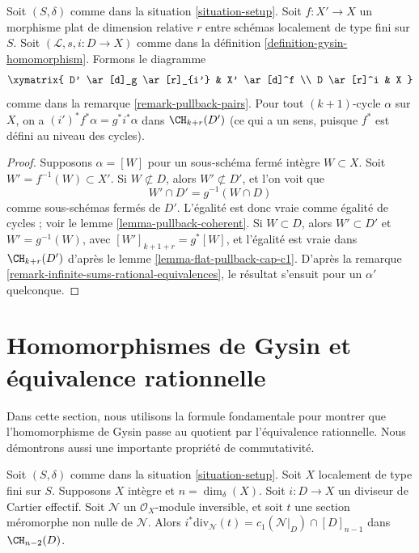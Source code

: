 \begin{lemma}
\label{lemma-gysin-flat-pullback}
Soit $(S, \delta)$ comme dans la situation \ref{situation-setup}. Soit $f : X' \to X$
un morphisme plat de dimension relative $r$ entre schémas localement de type fini
sur $S$. Soit $(\mathcal{L}, s, i : D \to X)$ comme dans la
définition \ref{definition-gysin-homomorphism}. Formons le diagramme
$$
\xymatrix{
D' \ar[d]_g \ar[r]_{i'} & X' \ar[d]^f \\
D \ar[r]^i & X
}
$$
comme dans la remarque \ref{remark-pullback-pairs}.
Pour tout $(k + 1)$-cycle $\alpha$ sur $X$, on a
$(i')^*f^*\alpha = g^*i^*\alpha$ dans $\CH_{k + r}(D')$
(ce qui a un sens, puisque $f^*$ est défini au niveau des cycles).
\end{lemma}

\begin{proof}
Supposons $\alpha = [W]$ pour un sous-schéma fermé intègre
$W \subset X$. Soit $W' = f^{-1}(W) \subset X'$. Si $W \not \subset D$,
alors $W' \not \subset D'$, et l'on voit que
$$
W' \cap D' = g^{-1}(W \cap D)
$$
comme sous-schémas fermés de $D'$. L'égalité
est donc vraie comme égalité de cycles ; voir le lemme \ref{lemma-pullback-coherent}.
Si $W \subset D$, alors $W' \subset D'$ et $W' = g^{-1}(W)$,
avec $[W']_{k + 1 + r} = g^*[W]$, et l'égalité est vraie dans
$\CH_{k + r}(D')$ d'après le lemme \ref{lemma-flat-pullback-cap-c1}.
D'après la remarque \ref{remark-infinite-sums-rational-equivalences},
le résultat s'ensuit pour un $\alpha'$ quelconque.
\end{proof}








\section{Homomorphismes de Gysin et équivalence rationnelle}
\label{section-gysin}

\noindent
Dans cette section, nous utilisons la formule fondamentale pour montrer que l'homomorphisme
de Gysin passe au quotient par l'équivalence rationnelle. Nous démontrons aussi une importante
propriété de commutativité.

\begin{lemma}
\label{lemma-gysin-factors-general}
Soit $(S, \delta)$ comme dans la situation \ref{situation-setup}.
Soit $X$ localement de type fini sur $S$.
Supposons $X$ intègre et $n = \dim_\delta(X)$.
Soit $i : D \to X$ un diviseur de Cartier effectif.
Soit $\mathcal{N}$ un $\mathcal{O}_X$-module inversible,
et soit $t$ une section méromorphe non nulle de $\mathcal{N}$.
Alors $i^*\text{div}_\mathcal{N}(t) = c_1(\mathcal{N}|_D) \cap [D]_{n - 1}$
dans $\CH_{n - 2}(D)$.
\end{lemma}

